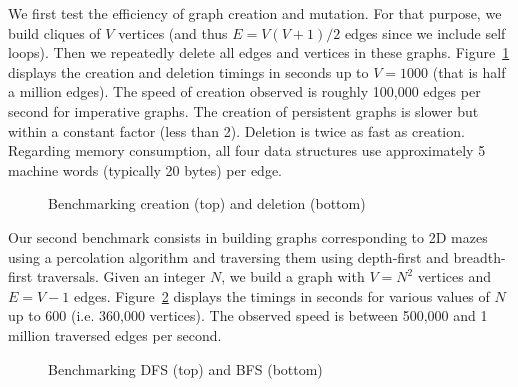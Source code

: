 \documentclass[tfpsymp,pagenumbers]{tfp07symp}
\begin{document}
We first test the efficiency of graph creation and mutation.  For that
purpose, we build cliques of $V$ vertices (and thus $E=V(V+1)/2$
edges since we include self loops).  Then we repeatedly delete all
edges and vertices in these graphs.  Figure~\ref{fig:bench:build}
displays the creation and deletion timings in seconds up to $V=1000$
(that is half a million edges).  The speed of creation observed is
roughly 100,000 edges per second for imperative graphs. The creation
of persistent graphs is slower but within a constant factor (less than
2). Deletion is twice as fast as creation.  Regarding memory
consumption, all four data structures use approximately 5 machine words
(typically 20 bytes) per edge.

\begin{figure}
  \centering%
  

  
  \caption{Benchmarking creation (top) and deletion (bottom)}
  \label{fig:bench:build}
\end{figure}

Our second benchmark consists in building graphs corresponding to 2D
mazes using a percolation algorithm and traversing them using
depth-first and breadth-first traversals. Given an integer $N$, we
build a graph with $V=N^2$ vertices and $E=V-1$ edges.
Figure~\ref{fig:bench:maze} displays the timings in seconds for
various values of $N$ up to 600 (i.e. 360,000 vertices). The observed
speed is between 500,000 and 1 million traversed edges per second.

% 

\begin{figure}
  \centering%
  

  
\vspace*{-1em}
  \caption{Benchmarking DFS (top) and BFS (bottom)}
  \label{fig:bench:maze}
\end{figure}
\end{document}
